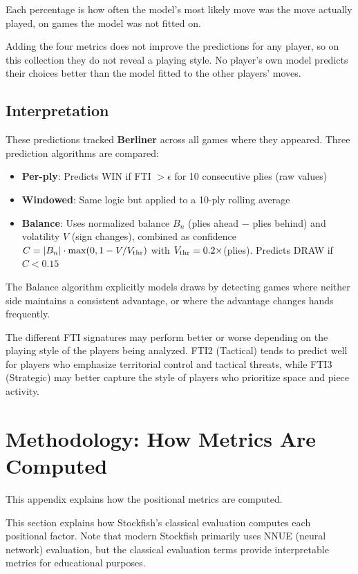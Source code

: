 \documentclass[11pt]{book}
\begin{document}
Each percentage is how often the model's most likely move was the move actually played, on games the model was not fitted on.

Adding the four metrics does not improve the predictions for any player, so on this collection they do not reveal a playing style.
 No player's own model predicts their choices better than the model fitted to the other players' moves.


\section{Interpretation}

These predictions tracked \textbf{Berliner} across all games where they appeared. 
Three prediction algorithms are compared:
\begin{itemize}
\item \textbf{Per-ply}: Predicts WIN if FTI $> \epsilon$ for 10 consecutive plies (raw values)
\item \textbf{Windowed}: Same logic but applied to a 10-ply rolling average
\item \textbf{Balance}: Uses normalized balance $B_n$ (plies ahead $-$ plies behind) and volatility $V$ (sign changes), combined as confidence $C = |B_n|\cdot\max(0, 1 - V/V_{\rm thr})$ with $V_{\rm thr} = 0.2\times$(plies). Predicts DRAW if $C < 0.15$
\end{itemize}

The Balance algorithm explicitly models draws by detecting games where neither side maintains a consistent advantage, or where the advantage changes hands frequently.

The different FTI signatures may perform better or worse depending on the playing style of the players being analyzed. FTI2 (Tactical) tends to predict well for players who emphasize territorial control and tactical threats, while FTI3 (Strategic) may better capture the style of players who prioritize space and piece activity.

\appendix
\chapter{Methodology: How Metrics Are Computed}

This appendix explains how the positional metrics are computed.


This section explains how Stockfish's classical evaluation computes each positional factor. Note that modern Stockfish primarily uses NNUE (neural network) evaluation, but the classical evaluation terms provide interpretable metrics for educational purposes.
\end{document}
